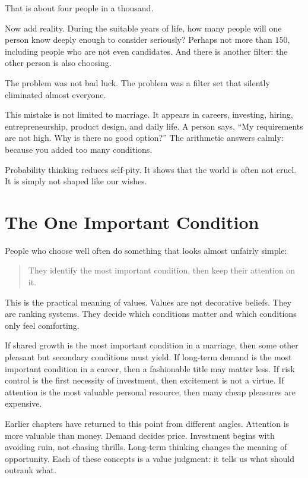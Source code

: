 That is about four people in a thousand.

Now add reality. During the suitable years of life, how many people will one person know deeply enough to consider seriously? Perhaps not more than \(150\), including people who are not even candidates. And there is another filter: the other person is also choosing.

The problem was not bad luck. The problem was a filter set that silently eliminated almost everyone.

This mistake is not limited to marriage. It appears in careers, investing, hiring, entrepreneurship, product design, and daily life. A person says, ``My requirements are not high. Why is there no good option?'' The arithmetic answers calmly: because you added too many conditions.

Probability thinking reduces self-pity. It shows that the world is often not cruel. It is simply not shaped like our wishes.

\section*{The One Important Condition}

People who choose well often do something that looks almost unfairly simple:

\begin{quote}
They identify the most important condition, then keep their attention on it.
\end{quote}

This is the practical meaning of values. Values are not decorative beliefs. They are ranking systems. They decide which conditions matter and which conditions only feel comforting.

If shared growth is the most important condition in a marriage, then some other pleasant but secondary conditions must yield. If long-term demand is the most important condition in a career, then a fashionable title may matter less. If risk control is the first necessity of investment, then excitement is not a virtue. If attention is the most valuable personal resource, then many cheap pleasures are expensive.

Earlier chapters have returned to this point from different angles. Attention is more valuable than money. Demand decides price. Investment begins with avoiding ruin, not chasing thrills. Long-term thinking changes the meaning of opportunity. Each of these concepts is a value judgment: it tells us what should outrank what.

